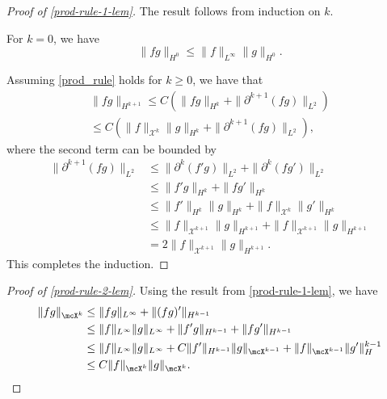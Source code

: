 \documentclass[oneside,reqno]{amsart}
\begin{document}
\begin{proof}[Proof of \cref{prod-rule-1-lem}]
	The result follows from induction on \(k\).
	
	For \(k = 0\), we have
	\begin{equation}
		\| f g \|_{H^0} \leq \| f \|_{L^\infty} \| g\|_{H^0}.
	\end{equation}
	
	Assuming \cref{prod_rule} holds for \(k\geq 0\), we have that 
	\begin{align*}
		\| f g \|_{H^{k+1}} \leq C \left( \| f g \|_{H^k} + \| \partial^{k+1}(fg) \|_{L^2}\right) \\
		\leq C \left( \| f\|_{\mathcal X^k} \| g \|_{H^k} + \| \partial^{k+1}(fg) \|_{L^2} \right),
	\end{align*}
	where the second term can be bounded by 
	\begin{align*}
		\| \partial^{k+1}(fg) \|_{L^2} &\leq \| \partial^k(f' g ) \|_{L^2} + \| \partial^k(f g') \|_{L^2} \\
		&\leq \| f' g \|_{H^k} + \| f g' \|_{H^k} \\
		&\leq \| f'\|_{H^k} \|g\|_{H^k} + \|f\|_{\mathcal X^k} \|g'\|_{H^k} \\
		&\leq \| f \|_{\mathcal X^{k+1}} \| g\|_{H^{k+1}} + \|f \|_{\mathcal X^{k+1}} \|g\|_{H^{k+1}} \\
		&= 2  \| f \|_{\mathcal X^{k+1}} \| g\|_{H^{k+1}}.
	\end{align*}
	This completes the induction.
\end{proof}

\begin{proof}[Proof of \cref{prod-rule-2-lem}]
	Using the result from \cref{prod-rule-1-lem}, we have 
	\begin{equation}
		\begin{aligned}
			\| f g \|_{\mcX^k} &\leq \| f g\|_{L^\infty} + \| (fg)' \|_{H^{k-1}} \\
			&\leq \|f \|_{L^\infty} \| g \|_{L^\infty} + \|f'g \|_{H^{k-1}} + \| fg' \|_{H^{k-1}} \\
			&\leq \|f \|_{L^\infty} \| g \|_{L^\infty} + C\|f'\|_{H^{k-1}} \|g \|_{\mcX^{k-1}} + \| f \|_{\mcX^{k-1}} \|g'\|_H^{k-1} \\
			&\leq C \|f \|_{\mcX^k} \|g\|_{\mcX^k} .
		\end{aligned}
	\end{equation}
\end{proof}
\end{document}
